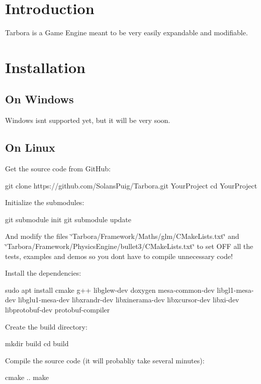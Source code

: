 \hypertarget{index_intro_sec}{}\section{Introduction}\label{index_intro_sec}
Tarbora is a Game Engine meant to be very easily expandable and modifiable. \hypertarget{index_install_sec}{}\section{Installation}\label{index_install_sec}
\hypertarget{index_windows}{}\subsection{On Windows}\label{index_windows}
Windows isn\textquotesingle{}t supported yet, but it will be very soon. \hypertarget{index_linux}{}\subsection{On Linux}\label{index_linux}
Get the source code from Git\+Hub\+: 
\begin{DoxyCode}
git clone https://github.com/SolansPuig/Tarbora.git YourProject
cd YourProject
\end{DoxyCode}


Initialize the submodules\+: 
\begin{DoxyCode}
git submodule init
git submodule update
\end{DoxyCode}
 And modify the files \char`\"{}\+Tarbora/\+Framework/\+Maths/glm/\+C\+Make\+Lists.\+txt\char`\"{} and \char`\"{}\+Tarbora/\+Framework/\+Physics\+Engine/bullet3/\+C\+Make\+Lists.\+txt\char`\"{} to set O\+FF all the tests, examples and demos so you don\textquotesingle{}t have to compile unnecessary code!

Install the dependencies\+: 
\begin{DoxyCode}
sudo apt install cmake g++ libglew-dev doxygen mesa-common-dev libgl1-mesa-dev libglu1-mesa-dev
       libxrandr-dev libxinerama-dev libxcursor-dev libxi-dev libprotobuf-dev protobuf-compiler
\end{DoxyCode}


Create the build directory\+: 
\begin{DoxyCode}
mkdir build
cd build
\end{DoxyCode}


Compile the source code (it will probabliy take several minutes)\+: 
\begin{DoxyCode}
cmake ..
make
\end{DoxyCode}


